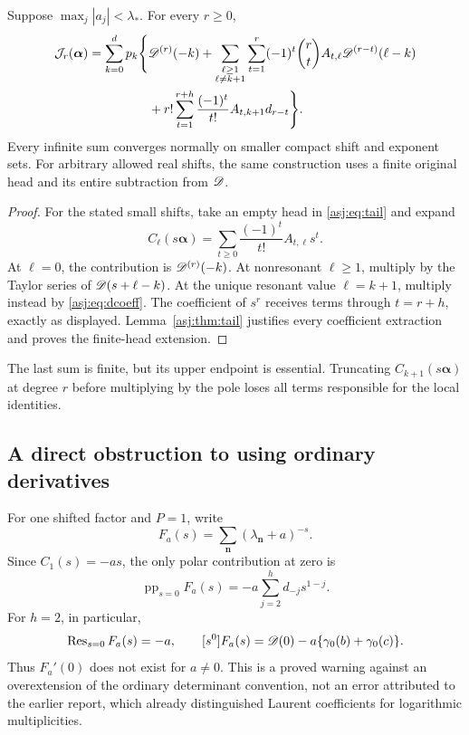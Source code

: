 \begin{theorem}\label{asj:thm:alljets}
Suppose $\max_j|a_j|<\lambda_*$. For every $r\ge0$,
\begin{align}\label{asj:eq:alljets}
 \mathcal J_r(\boldsymbol\alpha)
 =\sum_{k=0}^d p_k\Bigg\{&\mathscr D^{(r)}(-k)
  +\sum_{\substack{\ell\ge1\\\ell\ne k+1}}\sum_{t=1}^r
    (-1)^t\binom rt A_{t,\ell}\mathscr D^{(r-t)}(\ell-k)\notag\\
 &+r!\sum_{t=1}^{r+h}\frac{(-1)^t}{t!}
                       A_{t,k+1}d_{r-t}\Bigg\}.
\end{align}
Every infinite sum converges normally on smaller compact shift and
exponent sets. For arbitrary allowed real shifts, the same construction
uses a finite original head and its entire subtraction from $\mathscr D$.
\end{theorem}
\begin{proof}
For the stated small shifts, take an empty head in \eqref{asj:eq:tail} and
expand
\[
 C_\ell(s\boldsymbol\alpha)
     =\sum_{t\ge0}\frac{(-1)^t}{t!}A_{t,\ell}s^t.
\]
At $\ell=0$, the contribution is $\mathscr D^{(r)}(-k)$. At nonresonant
$\ell\ge1$, multiply by the Taylor series of $\mathscr D(s+\ell-k)$.
At the unique resonant value $\ell=k+1$, multiply instead by
\eqref{asj:eq:dcoeff}. The coefficient of $s^r$ receives terms through
$t=r+h$, exactly as displayed. Lemma~\ref{asj:thm:tail} justifies every
coefficient extraction and proves the finite-head extension.
\end{proof}

The last sum is finite, but its upper endpoint is essential. Truncating
$C_{k+1}(s\boldsymbol\alpha)$ at degree $r$ before multiplying by the
pole loses all terms responsible for the local identities.

\subsection{A direct obstruction to using ordinary derivatives}
For one shifted factor and $P=1$, write
\[
 F_a(s)=\sum_{\boldsymbol n}(\lambda_{\boldsymbol n}+a)^{-s}.
\]
Since $C_1(s)=-as$, the only polar contribution at zero is
\begin{equation}\label{asj:eq:Fpolar}
 \operatorname{pp}_{s=0}F_a(s)
       =-a\sum_{j=2}^h d_{-j}s^{1-j}.
\end{equation}
For $h=2$, in particular,
\begin{equation}\label{asj:eq:doublepole-example}
 \operatorname{Res}_{s=0}F_a(s)=-a,\qquad
 [s^0]F_a(s)=\mathscr D(0)-a\{\gamma_0(b)+\gamma_0(c)\}.
\end{equation}
Thus $F_a'(0)$ does not exist for $a\ne0$. This is a proved warning
against an overextension of the ordinary determinant convention, not
an error attributed to the earlier report, which already distinguished
Laurent coefficients for logarithmic multiplicities.
